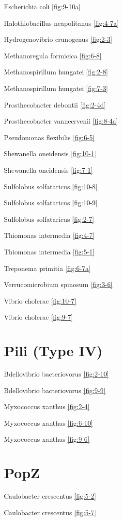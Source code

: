 \documentclass[]{tufte-book}
\begin{document}
Escherichia coli \ref{fig:9-10a}

Halothiobacillus neapolitanus \ref{fig:4-7a}

Hydrogenovibrio crunogenus \ref{fig:2-3}

Methanoregula formicica \ref{fig:6-8}

Methanospirillum hungatei \ref{fig:2-8}

Methanospirillum hungatei \ref{fig:7-3}

Prosthecobacter debontii \ref{fig:2-4d}

Prosthecobacter vanneervenii \ref{fig:8-4a}

Pseudomonas flexibilis \ref{fig:6-5}

Shewanella oneidensis \ref{fig:10-1}

Shewanella oneidensis \ref{fig:7-1}

Sulfolobus solfataricus \ref{fig:10-8}

Sulfolobus solfataricus \ref{fig:10-9}

Sulfolobus solfataricus \ref{fig:2-7}

Thiomonas intermedia \ref{fig:4-7}

Thiomonas intermedia \ref{fig:5-1}

Treponema primitia \ref{fig:6-7a}

Verrucomicrobium spinosum \ref{fig:3-6}

Vibrio cholerae \ref{fig:10-7}

Vibrio cholerae \ref{fig:9-7}

\section*{Pili (Type IV)}\label{pili-type-iv}

Bdellovibrio bacteriovorus \ref{fig:2-10}

Bdellovibrio bacteriovorus \ref{fig:9-9}

Myxococcus xanthus \ref{fig:2-4}

Myxococcus xanthus \ref{fig:6-10}

Myxococcus xanthus \ref{fig:9-6}

\section*{PopZ}\label{popz}

Caulobacter crescentus \ref{fig:5-2}

Caulobacter crescentus \ref{fig:5-7}
\end{document}
